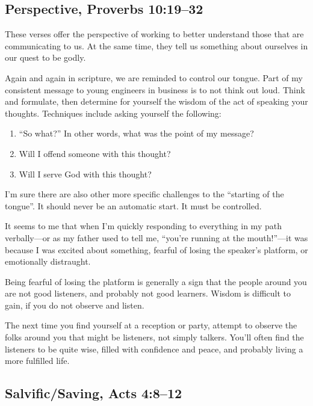 \documentclass[12pt]{memoir}
\begin{document}
\subsection[Perspective]{Perspective, Proverbs 10:19--32}

These verses offer the perspective of working to better understand those that are communicating to us. At the same time, they tell us something
about ourselves in our quest to be godly.

Again and again in scripture, we are reminded to control our tongue. Part of my consistent message to young engineers in business is to
not think out loud. Think and formulate, then determine for yourself the wisdom of the act of speaking your thoughts. Techniques include asking yourself the following:

\begin{enumerate}
\item ``So what?'' In other words, what was the point of my message?

\item Will I offend someone with this thought?
 
\item Will I serve God with this thought? 
\end{enumerate}

I'm sure there are also other more specific challenges to the ``starting of the tongue''. It should never be an automatic start. It must be controlled.

It seems to me that when I'm quickly responding to everything in my path verbally---or as my father used to tell me, ``you're running at the mouth!''---it was because I was excited about something, fearful of losing the speaker's platform, or emotionally distraught.

Being fearful of losing the platform is generally a sign that the people around you are not good listeners, and probably not good learners. Wisdom is difficult to gain, if you do not observe and listen.

The next time you find yourself at a reception or party, attempt to observe the folks around you that might be listeners, not simply talkers. You'll often find the listeners to be quite wise, filled with confidence and peace, and probably living a more fulfilled life.

\subsection[Salvific\slash{}Saving]{Salvific\slash{}Saving, Acts 4:8--12}
\end{document}
